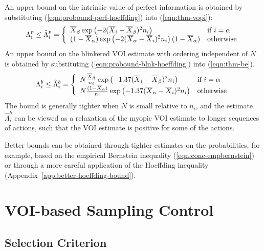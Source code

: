 \documentclass{article}
\begin{document}
An upper bound on the intrinsic value of perfect information is obtained by substituting
(\ref{eqn:probound-perf-hoeffding}) into (\ref{eqn:thm-vopi}):
\begin{equation}
  \Lambda_i^p \le \hat\Lambda_i^p=\left\{
  \begin{array}{l l}
    \overline X_\beta\exp\left(- 2(\overline X_i - \overline X_\beta)^2 n_i \right) & \mbox{{\rm if} $i=\alpha$} \\
    (1-\overline  X_\alpha)\exp\left(- 2(\overline X_\alpha - \overline X_i)^2 n_i \right)(1-\overline  X_\alpha)  &  \mbox{\rm otherwise}
  \end{array} \right.
\label{eqn:bound-perf-hoeffding}
\end{equation}
An upper bound on the blinkered VOI estimate with ordering independent of $N$ is obtained
by substituting (\ref{eqn:probound-blnk-hoeffding}) into (\ref{eqn:thm-be}).
\begin{equation}
  \Lambda_i^b \le \hat\Lambda_i^b=\left\{
  \begin{array}{l l}
    N \frac {\overline X_\beta} {n_i}\exp\left(- 1.37(\overline X_i - \overline X_\beta)^2 n_i\right)
      & \mbox{{\rm if} $i=\alpha$} \\
    N \frac {(1-\overline  X_\alpha)} {n_i} \exp\left(- 1.37(\overline X_\alpha - \overline X_i)^2 n_i\right)
      &  \mbox{\rm otherwise}
  \end{array} \right.
\label{eqn:bound-blnk-hoeffding}
\end{equation}
The bound is generally tighter when $N$ is small relative to $n_i$,
and the estimate $\hat\Lambda_i^b$ can be viewed as a relaxation of the myopic VOI
estimate to longer sequences of actions, such
that the VOI estimate is positive for some of the actions.

Better bounds can be obtained through tighter estimates on the
probabilities, for example, based on the empirical Bernstein inequality
(\ref{eqn:conc-empbernstein}) or through a more careful application of
the Hoeffding inequality (Appendix~\ref{app:better-hoeffding-bound}).

\section{VOI-based Sampling Control}

\subsection{Selection Criterion}
\end{document}
